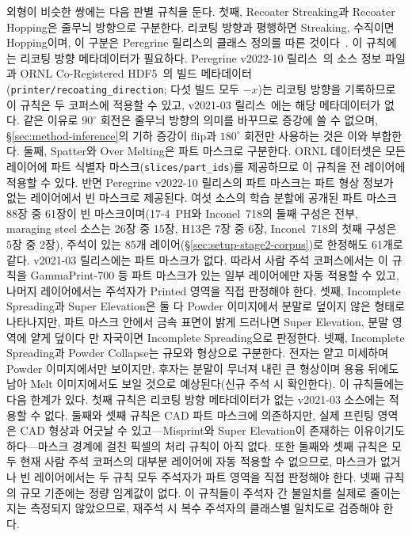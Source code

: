 외형이 비슷한 쌍에는 다음 판별 규칙을 둔다. 첫째, Recoater Streaking과
Recoater Hopping은 줄무늬 방향으로 구분한다. 리코팅 방향과 평행하면
Streaking, 수직이면 Hopping이며, 이 구분은 Peregrine 릴리스의 클래스
정의를 따른 것이다~\cite{Peregrine_v2021_03,Peregrine_v2022_10}. 이
규칙에는 리코팅 방향 메타데이터가 필요하다. Peregrine v2022-10
릴리스~\cite{Peregrine_v2022_10}의 소스 정보 파일과 ORNL Co-Registered
HDF5~\cite{ORNL_CoRegistered_Dataset}의
빌드 메타데이터(\texttt{printer/recoating\_direction}; 다섯 빌드 모두
$-x$)는 리코팅 방향을 기록하므로 이 규칙은 두 코퍼스에 적용할 수 있고,
v2021-03 릴리스~\cite{Peregrine_v2021_03}에는 해당 메타데이터가 없다.
같은 이유로 $90^{\circ}$ 회전은 줄무늬 방향의 의미를 바꾸므로 증강에 쓸
수 없으며, \S\ref{sec:method-inference}의 기하 증강이 flip과
$180^{\circ}$ 회전만 사용하는 것은 이와 부합한다. 둘째, Spatter와 Over
Melting은 파트 마스크로 구분한다. ORNL 데이터셋은 모든 레이어에 파트
식별자 마스크(\texttt{slices/part\_ids})를 제공하므로 이 규칙을 전
레이어에 적용할 수 있다. 반면 Peregrine v2022-10 릴리스의 파트 마스크는
파트 형상 정보가 없는 레이어에서 빈 마스크로 제공된다. 여섯 소스의 학습
분할에 공개된 파트 마스크 88장 중 61장이 빈 마스크이며(17-4~PH와
Inconel~718의 둘째 구성은 전부, maraging steel 소스는 26장 중 15장,
H13은 7장 중 6장, Inconel~718의 첫째 구성은 5장 중 2장), 주석이 있는
85개 레이어(\S\ref{sec:setup-stage2-corpus})로 한정해도 61개로
같다. v2021-03 릴리스에는 파트 마스크가 없다. 따라서 사람 주석
코퍼스에서는 이 규칙을 GammaPrint-700 등 파트 마스크가 있는 일부
레이어에만 자동 적용할 수 있고, 나머지 레이어에서는 주석자가 Printed
영역을 직접 판정해야 한다.
셋째,
Incomplete Spreading과 Super Elevation은 둘 다 Powder 이미지에서 분말로
덮이지 않은 형태로 나타나지만, 파트 마스크 안에서 금속 표면이 밝게
드러나면 Super Elevation, 분말 영역에 얕게 덮이다 만 자국이면 Incomplete
Spreading으로 판정한다. 넷째, Incomplete Spreading과 Powder Collapse는
규모와 형상으로 구분한다. 전자는 얕고 미세하며 Powder 이미지에서만
보이지만, 후자는 분말이 무너져 내린 큰 형상이며 용융 뒤에도 남아 Melt
이미지에서도 보일 것으로 예상된다(신규 주석 시 확인한다). 이
규칙들에는 다음 한계가 있다. 첫째 규칙은 리코팅
방향 메타데이터가 없는 v2021-03 소스에는 적용할 수 없다. 둘째와 셋째
규칙은 CAD 파트 마스크에 의존하지만, 실제 프린팅 영역은 CAD 형상과
어긋날 수 있고---Misprint와 Super Elevation이 존재하는 이유이기도
하다---마스크 경계에 걸친 픽셀의 처리 규칙이 아직 없다. 또한 둘째와
셋째 규칙은 모두 현재 사람 주석 코퍼스의 대부분 레이어에 자동 적용할 수
없으므로, 마스크가 없거나 빈 레이어에서는 두 규칙 모두 주석자가 파트
영역을 직접 판정해야 한다. 넷째 규칙의
규모 기준에는 정량 임계값이 없다. 이 규칙들이 주석자 간 불일치를 실제로
줄이는지는 측정되지 않았으므로, 재주석 시 복수 주석자의 클래스별
일치도로 검증해야 한다.

